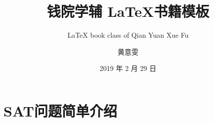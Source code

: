 \documentclass[
  10pt,
  twoside,
  openany,
  b5paper, %
  colorscheme = basic, %
]{qyxf-book}
\title{钱院学辅 \LaTeX 书籍模板}
\subtitle{\LaTeX{} book class of Qian Yuan Xue Fu}  %
\author{黄意雯}
\date{2019 年 2 月 29 日}
\begin{document}
\maketitle

\tableofcontents

\chapter{SAT问题简单介绍}
\end{document}
